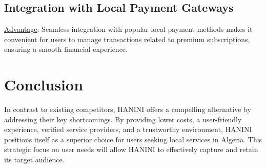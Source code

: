 \documentclass[12pt,a4paper]{report}
\begin{document}
\section{Integration with Local Payment Gateways}
\underline {Advantage}:  Seamless integration with popular local payment methods makes it convenient for users to manage transactions related to premium subscriptions, ensuring a smooth financial experience.
\chapter{Conclusion}
In contrast to existing competitors, HANINI offers a compelling alternative by addressing their key shortcomings. By providing lower costs, a user-friendly experience, verified service providers, and a trustworthy environment, HANINI positions itself as a superior choice for users seeking local services in Algeria. This strategic focus on user needs will allow HANINI to effectively capture and retain its target audience.
\end{document}
